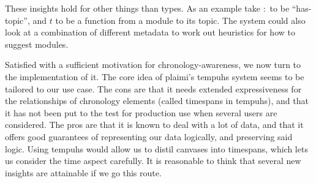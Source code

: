 These insights hold for other things than types. As an example take $:$ to be 
``has-topic'', and $t$ to be a function from a module to its topic. The system 
could also look at a combination of different metadata to work out heuristics 
for how to suggest modules.

Satisfied with a sufficient motivation for chronology-awareness, we now turn 
to the implementation of it. The core idea of plaimi's tempuhs system seems to 
be tailored to our use case. The cons are that it needs extended 
expressiveness for the relationships of chronology elements (called timespans 
in tempuhs), and that it has not been put to the test for production use when 
several users are considered. The pros are that it is known to deal with a lot 
of data, and that it offers good guarantees of representing our data 
logically, and preserving said logic. Using tempuhs would allow us to distil 
canvases into timespans, which lets us consider the time aspect carefully. It 
is reasonable to think that several new insights are attainable if we go this 
route.
